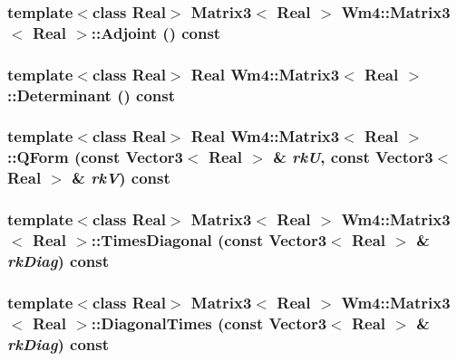 \subsubsection{\setlength{\rightskip}{0pt plus 5cm}template$<$class Real$>$ {\bf Matrix3}$<$ Real $>$ {\bf Wm4::Matrix3}$<$ Real $>$::Adjoint () const}\label{classWm4_1_1Matrix3_92b3859cfe0985e9587f5ff140c12817}


\subsubsection{\setlength{\rightskip}{0pt plus 5cm}template$<$class Real$>$ Real {\bf Wm4::Matrix3}$<$ Real $>$::Determinant () const}\label{classWm4_1_1Matrix3_f091e3148f4dac2c517355fe6db91340}


\subsubsection{\setlength{\rightskip}{0pt plus 5cm}template$<$class Real$>$ Real {\bf Wm4::Matrix3}$<$ Real $>$::QForm (const {\bf Vector3}$<$ Real $>$ \& {\em rk\-U}, const {\bf Vector3}$<$ Real $>$ \& {\em rk\-V}) const}\label{classWm4_1_1Matrix3_f8541197f88d8bc21d02a9999b5f4b2b}


\subsubsection{\setlength{\rightskip}{0pt plus 5cm}template$<$class Real$>$ {\bf Matrix3}$<$ Real $>$ {\bf Wm4::Matrix3}$<$ Real $>$::Times\-Diagonal (const {\bf Vector3}$<$ Real $>$ \& {\em rk\-Diag}) const}\label{classWm4_1_1Matrix3_1af4de6842845c5a6d9f0430990ff5ee}


\subsubsection{\setlength{\rightskip}{0pt plus 5cm}template$<$class Real$>$ {\bf Matrix3}$<$ Real $>$ {\bf Wm4::Matrix3}$<$ Real $>$::Diagonal\-Times (const {\bf Vector3}$<$ Real $>$ \& {\em rk\-Diag}) const}\label{classWm4_1_1Matrix3_c3368d3cd8f5ab653dda4b1b615e03c9}


